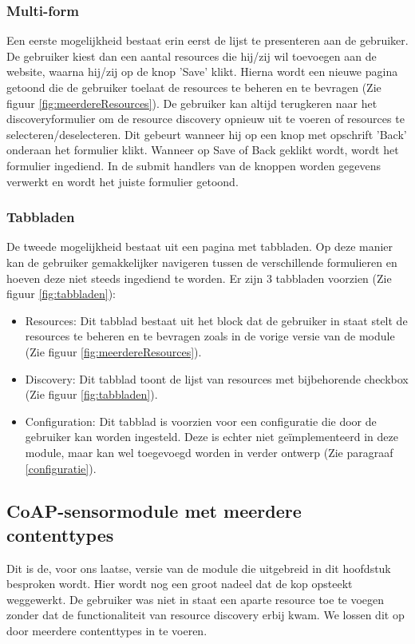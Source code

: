 \subsubsection{Multi-form}
Een eerste mogelijkheid bestaat erin eerst de lijst te presenteren aan de gebruiker. De gebruiker kiest dan een aantal resources die hij/zij wil toevoegen aan de website, waarna hij/zij op de knop 'Save' klikt. Hierna wordt een nieuwe pagina getoond die de gebruiker toelaat de resources te beheren en te bevragen (Zie figuur \ref{fig:meerdereResources}). De gebruiker kan altijd terugkeren naar het discoveryformulier om de resource discovery opnieuw uit te voeren of resources te selecteren/deselecteren. Dit gebeurt wanneer hij op een knop met opschrift 'Back' onderaan het formulier klikt. Wanneer op Save of Back geklikt wordt, wordt het formulier ingediend. In de submit handlers van de knoppen worden gegevens verwerkt en wordt het juiste formulier getoond.

\subsubsection{Tabbladen}
De tweede mogelijkheid bestaat uit een pagina met tabbladen. Op deze manier kan de gebruiker gemakkelijker navigeren tussen de verschillende formulieren en hoeven deze niet steeds ingediend te worden. Er zijn 3 tabbladen voorzien (Zie figuur \ref{fig:tabbladen}):
\begin{itemize}
\item Resources: Dit tabblad bestaat uit het block dat de gebruiker in staat stelt de resources te beheren en te bevragen zoals in de vorige versie van de module (Zie figuur \ref{fig:meerdereResources}).
\item Discovery: Dit tabblad toont de lijst van resources met bijbehorende checkbox (Zie figuur \ref{fig:tabbladen}).
\item Configuration: Dit tabblad is voorzien voor een configuratie die door de gebruiker kan worden ingesteld. Deze is echter niet ge\"{i}mplementeerd in deze module, maar kan wel toegevoegd worden in verder ontwerp (Zie paragraaf \ref{configuratie}).
\end{itemize}

\subsection{CoAP-sensormodule met meerdere contenttypes}
Dit is de, voor ons laatse, versie van de module die uitgebreid in dit hoofdstuk besproken wordt. Hier wordt nog een groot nadeel dat de kop opsteekt weggewerkt. De gebruiker was niet in staat een aparte resource toe te voegen zonder dat de functionaliteit van resource discovery erbij kwam. We lossen dit op door meerdere contenttypes in te voeren.

